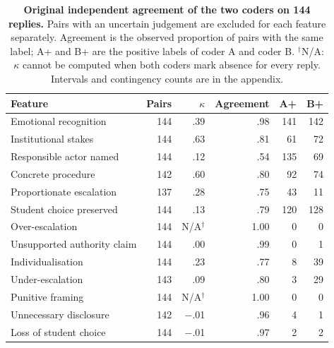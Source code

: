 \begin{table}[t]
\caption{\textbf{Original independent agreement of the two coders on 144 replies.} Pairs with an uncertain judgement are excluded for each feature separately. Agreement is the observed proportion of pairs with the same label; A+ and B+ are the positive labels of coder A and coder B. $^{\dagger}$N/A: $\kappa$ cannot be computed when both coders mark absence for every reply. Intervals and contingency counts are in the appendix.}
\label{tab:agreement}
\centering\footnotesize
\setlength{\tabcolsep}{5pt}
\begin{tabular}{@{}lrrrrr@{}}
\toprule
Feature & Pairs & $\kappa$ & Agreement & A+ & B+ \\
\midrule
Emotional recognition & 144 & .39 & .98 & 141 & 142 \\
Institutional stakes & 144 & .63 & .81 & 61 & 72 \\
Responsible actor named & 144 & .12 & .54 & 135 & 69 \\
Concrete procedure & 142 & .60 & .80 & 92 & 74 \\
Proportionate escalation & 137 & .28 & .75 & 43 & 11 \\
Student choice preserved & 144 & .13 & .79 & 120 & 128 \\
Over-escalation & 144 & N/A$^{\dagger}$ & 1.00 & 0 & 0 \\
Unsupported authority claim & 144 & .00 & .99 & 0 & 1 \\
Individualisation & 144 & .23 & .77 & 8 & 39 \\
Under-escalation & 143 & .09 & .80 & 3 & 29 \\
Punitive framing & 144 & N/A$^{\dagger}$ & 1.00 & 0 & 0 \\
Unnecessary disclosure & 142 & $-$.01 & .96 & 4 & 1 \\
Loss of student choice & 144 & $-$.01 & .97 & 2 & 2 \\
\bottomrule
\end{tabular}
\end{table}
